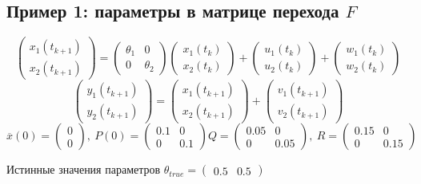 \documentclass[a4paper,14pt]{extarticle}
\newcommand{\fut}[0]{t_{k+1}}
\begin{document}
\subsection{Пример 1: параметры в матрице перехода $F$}
\[
  \begin{pmatrix} x_1(\fut) \\ x_2(\fut) \end{pmatrix} =
  \begin{pmatrix} \theta_1 & 0 \\ 0 & \theta_2 \end{pmatrix}
  \begin{pmatrix} x_1(t_k) \\ x_2(t_k) \end{pmatrix}
  + \begin{pmatrix} u_1(t_k) \\ u_2(t_k) \end{pmatrix}
  + \begin{pmatrix} w_1(t_k) \\ w_2(t_k) \end{pmatrix}
\]
\[
  \begin{pmatrix} y_1(\fut) \\ y_2(\fut) \end{pmatrix} =
  \begin{pmatrix} x_1(\fut) \\ x_2(\fut) \end{pmatrix} +
  \begin{pmatrix} v_1(\fut) \\ v_2(\fut) \end{pmatrix}
\]
\[
  \overline{x}(0) = \begin{pmatrix} 0 \\ 0 \end{pmatrix},\
  P(0) = \begin{pmatrix} 0.1 & 0 \\ 0 & 0.1 \end{pmatrix}
  Q = \begin{pmatrix} 0.05 & 0 \\ 0 & 0.05 \end{pmatrix},\
  R = \begin{pmatrix} 0.15 & 0 \\ 0 & 0.15 \end{pmatrix}
\]

Истинные значения параметров
$\theta_{true} = \begin{pmatrix} 0.5 & 0.5 \end{pmatrix}$ \\
\end{document}
